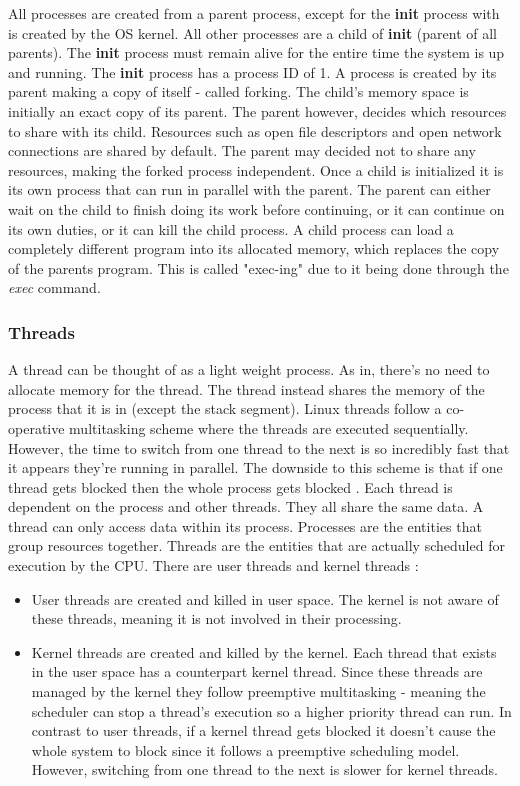 \documentclass[onecolumn,draftclsnofoot, 10pt, compsoc]{IEEEtran}
\def \ParSpace{\vspace{.75em}}
\begin{document}
			\ParSpace
			All processes are created from a parent process, except for the \textbf{init} process with is created by the OS kernel. 
			All other processes are a child of \textbf{init}  (parent of all parents).
			The \textbf{init}  process must remain alive for the entire time the system is up and running.
			The \textbf{init} process has a process ID of 1. 
			A process is created by its parent making a copy of itself - called forking.
			The child's memory space is initially an exact copy of its parent.
			The parent however, decides which resources to share with its child. Resources such as open file descriptors and open network connections are shared by default. The parent may decided not to share any resources, making the forked process independent.
			Once a child is initialized it is its own process that can run in parallel with the parent. 
			The parent can either wait on the child to finish doing its work before continuing, or it can continue on its own duties, or it can kill the child process.
			A child process can load a completely different program into its allocated memory, which replaces the copy of the parents program. This is called "exec-ing" due to it being done through the \textit{exec} command. 
	
		\subsubsection{Threads}
			A thread can be thought of as a light weight process. 
			As in, there's no need to allocate memory for the thread. 
			The thread instead shares the memory of the process that it is in (except the stack segment).
			Linux threads follow a co-operative multitasking scheme where the threads are executed sequentially. 
			However, the time to switch from one thread to the next is so incredibly fast that it appears they're running in parallel. 
			The downside to this scheme is that if one thread gets blocked then the whole process gets blocked \cite{threadsVidLinux}.
			Each thread is dependent on the process and other threads. They all share the same data. A thread can only access data within its process.
			Processes are the entities that group resources together. Threads are the entities that are actually scheduled for execution by the CPU.
			There are user threads and kernel threads \cite{threadsArtiLinux}:
			\begin{itemize}
				\item User threads are created and killed in user space. 
				The kernel is not aware of these threads, meaning it is not involved in their processing.
				\item Kernel threads are created and killed by the kernel. 
				Each thread that exists in the user space has a counterpart kernel thread. 
				Since these threads are managed by the kernel they follow preemptive multitasking - meaning the scheduler can stop a thread's execution so a higher priority thread can run. 
				In contrast to user threads, if a kernel thread gets blocked it doesn't cause the whole system to block since it follows a preemptive scheduling model. 
				However, switching from one thread to the next is slower for kernel threads.
			\end{itemize}
	
\end{document}
